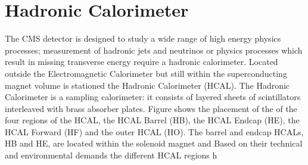 \section{Hadronic Calorimeter}
The CMS detector is designed to study a wide range of high energy 
physics processes; measurement of hadronic jets and neutrinos or
physics processes which result in missing transverse energy require
a hadronic calorimeter. 
Located outside the Electromagnetic Calorimeter but still within the
superconducting magnet volume is stationed the Hadronic Calorimeter (HCAL).
The Hadronic Calorimeter is a sampling calorimeter: it consists of layered 
sheets of scintillators interleaved with brass absorber plates. Figure %
shows the placement of the of the four regions of the HCAL, the HCAL Barrel (HB),
the HCAL Endcap (HE), the HCAL Forward (HF) and the outer HCAL (HO). 
The barrel and endcap HCALs, HB and HE, are located within the 
solenoid magnet and 
Based on their technical and environmental demands the different HCAL
regions h

